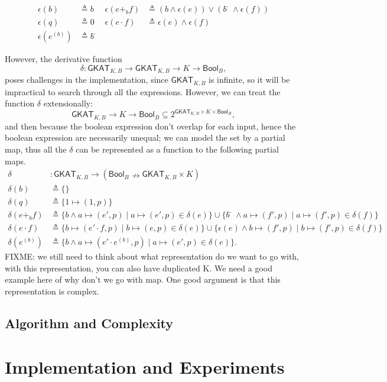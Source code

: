 \documentclass{extarticle}
\newcommand{\theoryOf}[1]{\ensuremath{\mathsf{#1}}}
\newcommand{\GKAT}{\theoryOf{GKAT}}
\newcommand{\Bool}{\theoryOf{Bool}}
\begin{document}
\begin{align*}
    ϵ(b) & ≜ b 
        &  ϵ(e +_b f) & ≜ (b ∧ ϵ(e)) ∨ (b̄ ∧ ϵ(f))\\
    ϵ(q) & ≜ 0
        & ϵ(e ⋅ f) & ≜ ϵ(e) ∧ ϵ(f)\\  
    ϵ(e^{(b)}) & ≜ b̄ 
\end{align*}

However, the derivative function \[δ: \GKAT_{K, B} → \GKAT_{K, B} → K → \Bool_B,\] poses challenges in the implementation, since \(\GKAT_{K, B}\) is infinite, so it will be impractical to search through all the expressions.
However, we can treat the function \(δ\) extensionally: \[\GKAT_{K, B} → K → \Bool_B ⊆ 2^{\GKAT_{K, B} × K × \Bool_B},\]
and then because the boolean expression don't overlap for each input, hence the boolean expression are necessarily unequal; 
we can model the set by a partial map, thus all the \(δ\) can be represented as a function to the following partial maps.
\begin{align*}
    δ & : \GKAT_{K, B} → (\Bool_B ↛ \GKAT_{K, B} × K) \\
    δ(b) & ≜ \{\} \\
    δ(q) & ≜ \{1 ↦ (1, p)\}\\  
    δ(e +_b f) & ≜ \{b ∧ a ↦ (e', p) ∣ a ↦ (e', p) ∈ δ(e)\} 
        ∪ \{b̄ ∧ a ↦ (f', p) ∣ a ↦ (f', p) ∈ δ(f)\}\\
    δ(e ⋅ f) & ≜ \{b ↦ (e' ⋅ f, p) ∣ b ↦ (e, p) ∈ δ(e)\}
        ∪ \{ϵ(e) ∧ b ↦ (f', p) ∣ b ↦ (f', p) ∈ δ(f)\}\\
    δ(e^{(b)}) & ≜ \{b ∧ a ↦ (e' ⋅ e^{(b)}, p) ∣ a ↦ (e', p) ∈ δ(e)\}.
\end{align*}
FIXME: we still need to think about what representation do we want to go with, with this representation, you can also have duplicated K. We need a good example here of why don't we go with map. One good argument is that this representation is complex.





\subsection{Algorithm and Complexity}


\section{Implementation and Experiments}
\end{document}
